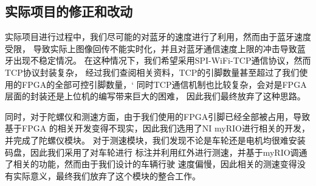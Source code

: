 \documentclass[a4paper]{paper}
\begin{document}
\subsection{实际项目的修正和改动}
实际项目进行过程中，我们尽可能的对蓝牙的速度进行了利用，然而由于蓝牙速度受限，
导致实际上图像回传不能实时化，并且对蓝牙通信速度上限的冲击导致蓝牙出现不稳定情况。
在这种情况下，我们希望采用SPI-WiFi-TCP通信协议，然而TCP协议封装复杂，
经过我们查阅相关资料，TCP的引脚数量甚至超过了我们使用的FPGA的全部可控引脚数量，‘
同时TCP通信机制也比较复杂，会对是FPGA层面的封装还是上位机的编写带来巨大的困难，
因此我们最终放弃了这种思路。

同时，对于陀螺仪和测速方面，由于我们使用的FPGA引脚已经全部被占用，导致基于FPGA
的相关开发变得不现实，因此我们选用了NI myRIO进行相关的开发，并完成了陀螺仪模块。
对于测速模块，我们发现不论是车轮还是电机均很难安装码盘，因此我们采用了对车轮进行
标注并利用红外进行测速，并基于myRIO调通了相关的功能，然而由于我们设计的车辆行驶
速度偏慢，因此相关的测速变得没有实际意义，最终我们放弃了这个模块的整合工作。
\end{document}
